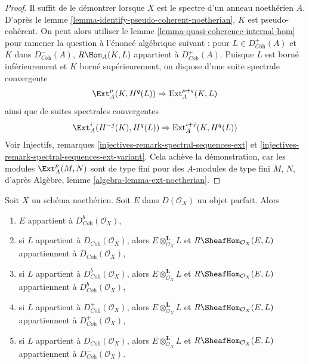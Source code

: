 \begin{proof}
Il suffit de le démontrer lorsque $X$ est le spectre
d'un anneau noethérien $A$.
D'après le lemme \ref{lemma-identify-pseudo-coherent-noetherian},
$K$ est pseudo-cohérent.
On peut alors utiliser le lemme \ref{lemma-quasi-coherence-internal-hom}
pour ramener la question à l'énoncé algébrique suivant :
pour $L \in D^+_{\textit{Coh}}(A)$ et $K$ dans $D^-_{\textit{Coh}}(A)$,
$R\Hom_A(K, L)$ appartient à $D^+_{\textit{Coh}}(A)$.
Puisque $L$ est borné inférieurement et $K$ borné supérieurement, on dispose d'une
suite spectrale convergente
$$
\Ext^p_A(K, H^q(L)) \Rightarrow \text{Ext}^{p + q}_A(K, L)
$$
ainsi que de suites spectrales convergentes
$$
\Ext^i_A(H^{-j}(K), H^q(L)) \Rightarrow \text{Ext}^{i + j}_A(K, H^q(L))
$$
Voir Injectifs, remarques \ref{injectives-remark-spectral-sequences-ext}
et \ref{injectives-remark-spectral-sequences-ext-variant}.
Cela achève la démonstration, car les modules $\Ext^p_A(M, N)$
sont de type fini pour des $A$-modules de type fini $M$, $N$, d'après
Algèbre, lemme \ref{algebra-lemma-ext-noetherian}.
\end{proof}

\begin{lemma}
\label{lemma-perfect-on-noetherian}
Soit $X$ un schéma noethérien. Soit $E$ dans $D(\mathcal{O}_X)$ un objet parfait.
Alors
\begin{enumerate}
\item $E$ appartient à $D^b_{\textit{Coh}}(\mathcal{O}_X)$,
\item si $L$ appartient à $D_{\textit{Coh}}(\mathcal{O}_X)$, alors
$E \otimes_{\mathcal{O}_X}^\mathbf{L} L$ et
$R\SheafHom_{\mathcal{O}_X}(E, L)$ appartiennent à
$D_{\textit{Coh}}(\mathcal{O}_X)$,
\item si $L$ appartient à $D^b_{\textit{Coh}}(\mathcal{O}_X)$, alors
$E \otimes_{\mathcal{O}_X}^\mathbf{L} L$ et
$R\SheafHom_{\mathcal{O}_X}(E, L)$ appartiennent à
$D^b_{\textit{Coh}}(\mathcal{O}_X)$,
\item si $L$ appartient à $D^+_{\textit{Coh}}(\mathcal{O}_X)$, alors
$E \otimes_{\mathcal{O}_X}^\mathbf{L} L$ et
$R\SheafHom_{\mathcal{O}_X}(E, L)$ appartiennent à
$D^+_{\textit{Coh}}(\mathcal{O}_X)$,
\item si $L$ appartient à $D^-_{\textit{Coh}}(\mathcal{O}_X)$, alors
$E \otimes_{\mathcal{O}_X}^\mathbf{L} L$ et
$R\SheafHom_{\mathcal{O}_X}(E, L)$ appartiennent à
$D^-_{\textit{Coh}}(\mathcal{O}_X)$.
\end{enumerate}
\end{lemma}

